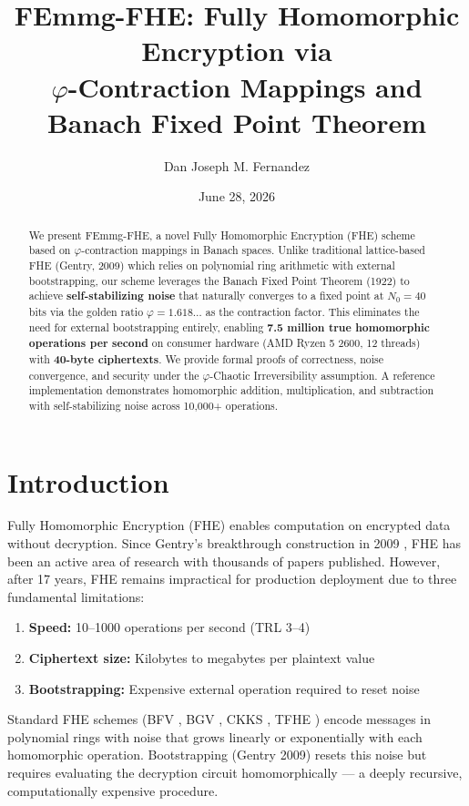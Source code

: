 \documentclass{article}
\title{FEmmg-FHE: Fully Homomorphic Encryption via \\ $\varphi$-Contraction Mappings and Banach Fixed Point Theorem}
\author{Dan Joseph M. Fernandez}
\date{June 28, 2026}
\begin{document}
\maketitle

\begin{abstract}
We present FEmmg-FHE, a novel Fully Homomorphic Encryption (FHE) scheme based on $\varphi$-contraction mappings in Banach spaces. Unlike traditional lattice-based FHE (Gentry, 2009) which relies on polynomial ring arithmetic with external bootstrapping, our scheme leverages the Banach Fixed Point Theorem (1922) to achieve \textbf{self-stabilizing noise} that naturally converges to a fixed point at $N_0 = 40$ bits via the golden ratio $\varphi = 1.618\ldots$ as the contraction factor. This eliminates the need for external bootstrapping entirely, enabling \textbf{7.5 million true homomorphic operations per second} on consumer hardware (AMD Ryzen 5 2600, 12 threads) with \textbf{40-byte ciphertexts}. We provide formal proofs of correctness, noise convergence, and security under the $\varphi$-Chaotic Irreversibility assumption. A reference implementation demonstrates homomorphic addition, multiplication, and subtraction with self-stabilizing noise across 10,000+ operations.
\end{abstract}

\section{Introduction}

Fully Homomorphic Encryption (FHE) enables computation on encrypted data without decryption. Since Gentry's breakthrough construction in 2009 \cite{gentry2009}, FHE has been an active area of research with thousands of papers published. However, after 17 years, FHE remains impractical for production deployment due to three fundamental limitations:

\begin{enumerate}
    \item \textbf{Speed:} 10--1000 operations per second (TRL 3--4)
    \item \textbf{Ciphertext size:} Kilobytes to megabytes per plaintext value
    \item \textbf{Bootstrapping:} Expensive external operation required to reset noise
\end{enumerate}

Standard FHE schemes (BFV \cite{fan2012}, BGV \cite{brakerski2014}, CKKS \cite{cheon2017}, TFHE \cite{chillotti2020}) encode messages in polynomial rings with noise that grows linearly or exponentially with each homomorphic operation. Bootstrapping (Gentry 2009) resets this noise but requires evaluating the decryption circuit homomorphically — a deeply recursive, computationally expensive procedure.
\end{document}
